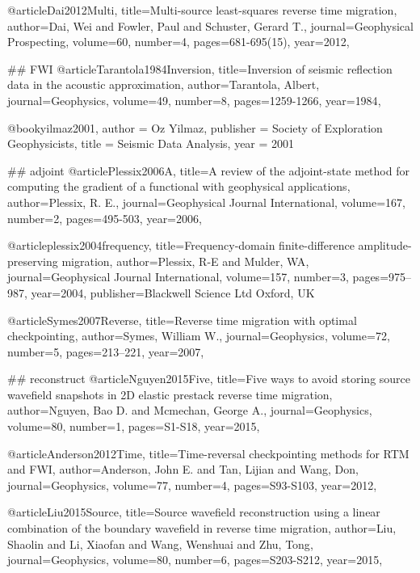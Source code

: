@article{Dai2012Multi,
  title={Multi-source least-squares reverse time migration},
  author={Dai, Wei and Fowler, Paul and Schuster, Gerard T.},
  journal={Geophysical Prospecting},
  volume={60},
  number={4},
  pages={681-695(15)},
  year={2012},
}

## FWI
@article{Tarantola1984Inversion,
  title={Inversion of seismic reflection data in the acoustic approximation},
  author={Tarantola, Albert},
  journal={Geophysics},
  volume={49},
  number={8},
  pages={1259-1266},
  year={1984},
}

@book{yilmaz2001,
   author = {Oz Yilmaz},
   publisher = {Society of Exploration Geophysicists},
   title = {Seismic Data Analysis},
   year = {2001}
}

## adjoint
@article{Plessix2006A,
  title={A review of the adjoint-state method for computing the gradient of a functional with geophysical applications},
  author={Plessix, R. E.},
  journal={Geophysical Journal International},
  volume={167},
  number={2},
  pages={495-503},
  year={2006},
}

@article{plessix2004frequency,
  title={Frequency-domain finite-difference amplitude-preserving migration},
  author={Plessix, R-E and Mulder, WA},
  journal={Geophysical Journal International},
  volume={157},
  number={3},
  pages={975--987},
  year={2004},
  publisher={Blackwell Science Ltd Oxford, UK}
}

@article{Symes2007Reverse,
  title={Reverse time migration with optimal checkpointing},
  author={Symes, William W.},
  journal={Geophysics},
  volume={72},
  number={5},
  pages={213--221},
  year={2007},
}


## reconstruct
@article{Nguyen2015Five,
  title={Five ways to avoid storing source wavefield snapshots in 2D elastic prestack reverse time migration},
  author={Nguyen, Bao D. and Mcmechan, George A.},
  journal={Geophysics},
  volume={80},
  number={1},
  pages={S1-S18},
  year={2015},
}

@article{Anderson2012Time,
  title={Time-reversal checkpointing methods for {RTM} and {FWI}},
  author={Anderson, John E. and Tan, Lijian and Wang, Don},
  journal={Geophysics},
  volume={77},
  number={4},
  pages={S93-S103},
  year={2012},
}

@article{Liu2015Source,
  title={Source wavefield reconstruction using a linear combination of the boundary wavefield in reverse time migration},
  author={Liu, Shaolin and Li, Xiaofan and Wang, Wenshuai and Zhu, Tong},
  journal={Geophysics},
  volume={80},
  number={6},
  pages={S203-S212},
  year={2015},
}

